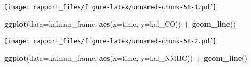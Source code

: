 \documentclass[]{article}
\newenvironment{Shaded}{\begin{snugshade}}{\end{snugshade}}
\newcommand{\KeywordTok}[1]{\textcolor[rgb]{0.13,0.29,0.53}{\textbf{#1}}}
\newcommand{\DataTypeTok}[1]{\textcolor[rgb]{0.13,0.29,0.53}{#1}}
\newcommand{\DecValTok}[1]{\textcolor[rgb]{0.00,0.00,0.81}{#1}}
\newcommand{\StringTok}[1]{\textcolor[rgb]{0.31,0.60,0.02}{#1}}
\newcommand{\CommentTok}[1]{\textcolor[rgb]{0.56,0.35,0.01}{\textit{#1}}}
\newcommand{\OperatorTok}[1]{\textcolor[rgb]{0.81,0.36,0.00}{\textbf{#1}}}
\newcommand{\NormalTok}[1]{#1}
\begin{document}
\begin{Shaded}
\end{Shaded}

\texttt{[image: rapport\_files/figure-latex/unnamed-chunk-58-1.pdf]}

\begin{Shaded}
\begin{Highlighting}[]
\KeywordTok{ggplot}\NormalTok{(}\DataTypeTok{data=}\NormalTok{kalman_frame, }\KeywordTok{aes}\NormalTok{(}\DataTypeTok{x=}\NormalTok{time, }\DataTypeTok{y=}\NormalTok{kal_CO)) }\OperatorTok{+}\StringTok{ }\KeywordTok{geom_line}\NormalTok{()}
\end{Highlighting}
\end{Shaded}

\texttt{[image: rapport\_files/figure-latex/unnamed-chunk-58-2.pdf]}

\begin{Shaded}
\begin{Highlighting}[]
\KeywordTok{ggplot}\NormalTok{(}\DataTypeTok{data=}\NormalTok{kalman_frame, }\KeywordTok{aes}\NormalTok{(}\DataTypeTok{x=}\NormalTok{time, }\DataTypeTok{y=}\NormalTok{kal_NMHC)) }\OperatorTok{+}\StringTok{ }\KeywordTok{geom_line}\NormalTok{()}
\end{Highlighting}
\end{Shaded}
\end{document}
